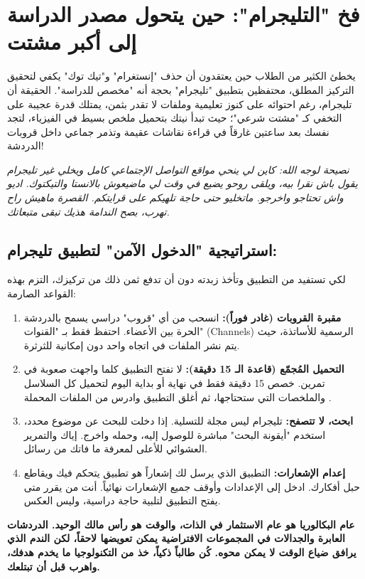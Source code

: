 \documentclass[12pt,a4paper]{book}
\newcommand{\quoteAr}[1]{%
	\begin{myquote}
		\itshape #1
	\end{myquote}
}
\newcommand{\importantAr}[1]{%
	\begin{important}
		\bfseries #1
	\end{important}
}
\begin{document}
\section{فخ "التليجرام": حين يتحول مصدر الدراسة إلى أكبر مشتت}

يخطئ الكثير من الطلاب حين يعتقدون أن حذف "إنستغرام" و"تيك توك" يكفي لتحقيق التركيز المطلق، محتفظين بتطبيق "تليجرام" بحجة أنه "مخصص للدراسة". الحقيقة أن تليجرام، رغم احتوائه على كنوز تعليمية وملفات لا تقدر بثمن، يمتلك قدرة عجيبة على التخفي كـ "مشتت شرعي"؛ حيث تبدأ نيتك بتحميل ملخص بسيط في الفيزياء، لتجد نفسك بعد ساعتين غارقاً في قراءة نقاشات عقيمة وتذمر جماعي داخل قروبات الدردشة!

\quoteAr{نصيحة لوجه الله: كاين لي ينحي مواقع التواصل الإجتماعي كامل ويخلي غير تليجرام يقول باش نقرا بيه، ويلقى روحو يضيع في وقت لي ماضيعوش بالانستا والتيكتوك. اديو واش تحتاجو واخرجو. ماتخليو حتى حاجة تلهيكم على قرايتكم. القصرة ماهيش راح تهرب، بصح الندامة هذيك تبقى متبعاتك.}

\subsection*{استراتيجية "الدخول الآمن" لتطبيق تليجرام:}
لكي تستفيد من التطبيق وتأخذ زبدته دون أن تدفع ثمن ذلك من تركيزك، التزم بهذه القواعد الصارمة:

\begin{enumerate}
	\item \textbf{مقبرة القروبات (غادر فوراً):} انسحب من أي "قروب" دراسي يسمح بالدردشة الحرة بين الأعضاء. احتفظ فقط بـ "القنوات" (Channels) الرسمية للأساتذة، حيث يتم نشر الملفات في اتجاه واحد دون إمكانية للثرثرة.
	\item \textbf{التحميل المُجمّع (قاعدة الـ 15 دقيقة):} لا تفتح التطبيق كلما واجهت صعوبة في تمرين. خصص 15 دقيقة فقط في نهاية أو بداية اليوم لتحميل كل السلاسل والملخصات التي ستحتاجها، ثم أغلق التطبيق وادرس من الملفات المحملة .
	\item \textbf{ابحث، لا تتصفح:} تليجرام ليس مجلة للتسلية. إذا دخلت للبحث عن موضوع محدد، استخدم "أيقونة البحث" مباشرة للوصول إليه، وحمله واخرج. إياك والتمرير العشوائي للأعلى لمعرفة ما فاتك من رسائل.
	\item \textbf{إعدام الإشعارات:} التطبيق الذي يرسل لك إشعاراً هو تطبيق يتحكم فيك ويقاطع حبل أفكارك. ادخل إلى الإعدادات وأوقف جميع الإشعارات نهائياً. أنت من يقرر متى يفتح التطبيق لتلبية حاجة دراسية، وليس العكس.
\end{enumerate}

\importantAr{عام البكالوريا هو عام الاستثمار في الذات، والوقت هو رأس مالك الوحيد. الدردشات العابرة والجدالات في المجموعات الافتراضية يمكن تعويضها لاحقاً، لكن الندم الذي يرافق ضياع الوقت لا يمكن محوه. كُن طالباً ذكياً، خذ من التكنولوجيا ما يخدم هدفك، واهرب قبل أن تبتلعك.}
\end{document}
